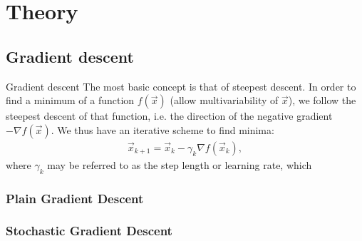 \section{Theory}\label{sec:theory}

\subsection{Gradient descent}\label{sec:gradient_descent}
Gradient descent \citep{mhjensen}
The most basic concept is that of steepest descent. In order to find a minimum of a function $f(\vec{x})$ (allow multivariability of $\vec{x}$), we follow the steepest descent of that function, i.e. the direction of the negative gradient $-\nabla f(\vec{x})$. We thus have an iterative scheme to find minima:
\begin{align}\label{eq:steepest_descent}
    \vec{x}_{k+1} = \vec{x}_k - \gamma_k\nabla f(\vec{x}_k),
\end{align}
where $\gamma_k$ may be referred to as the step length or learning rate, which

\subsubsection{Plain Gradient Descent}\label{sec:plain_gradient_descent}

\subsubsection{Stochastic Gradient Descent}\label{sec:stochastic_gradient_descent}